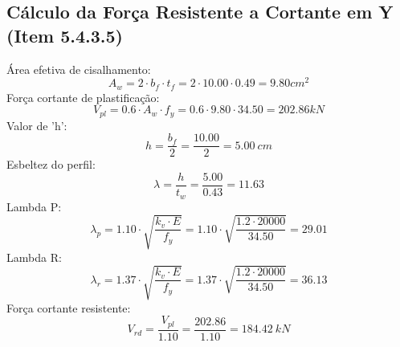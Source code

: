 \documentclass{article}%
\begin{document}
\subsection{Cálculo da Força Resistente a Cortante em Y (Item 5.4.3.5)}%
\label{subsec:ClculodaForaResistenteaCortanteemY(Item5.4.3.5)}%
Área efetiva de cisalhamento:%
\[%
A_w = 2 \cdot b_f \cdot t_f = 2 \cdot 10.00 \cdot 0.49  = 9.80    {cm}^2%
\]%
Força cortante de plastificação:%
\[%
V_{pl} = 0.6 \cdot A_w \cdot f_y = 0.6 \cdot 9.80 \cdot 34.50 = 202.86    kN%
\]%
Valor de 'h':%
\[%
h = \frac{b_f}{2} = \frac{10.00}{2} = 5.00 \ cm%
\]%
Esbeltez do perfil:%
\[%
\lambda = \frac{h}{t_w} = \frac{5.00}{0.43} = 11.63%
\]%
Lambda P:%
\[%
\lambda_p = 1.10 \cdot \sqrt{\frac{{k_v \cdot E}}{{f_y}}} = 1.10 \cdot \sqrt{\frac{{1.2 \cdot 20000}}{{34.50}}} = 29.01%
\]%
Lambda R:%
\[%
\lambda_r = 1.37 \cdot \sqrt{\frac{{k_v \cdot E}}{{f_y}}} = 1.37 \cdot \sqrt{\frac{{1.2 \cdot 20000}}{{34.50}}} = 36.13 %
\]%
Força cortante resistente:%
\[%
V_{rd} = \frac{V_{pl}}{1.10}  = \frac{202.86}{1.10} = 184.42   ~   kN%
\]

%
\end{document}
